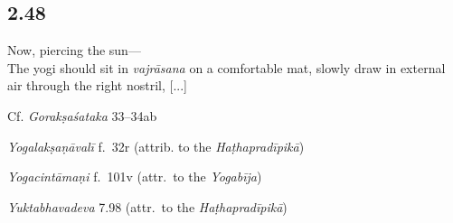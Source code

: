\begin{ekdosis}

\subsection*{2.48}
\begin{translation}[hp02_048]
Now, piercing the sun---\\
The yogi should sit in \emph{vajrāsana} on a comfortable mat, slowly draw in external air through the right nostril, [...]
\end{translation}

\begin{sources}[hp02_048]
Cf. \emph{Gorakṣaśataka} 33–34ab
\begin{versinnote}
\end{versinnote} 
\end{sources}

\begin{testimonia}[hp02_048]
\emph{Yogalakṣaṇāvalī} f.~32r (attrib. to the \emph{Haṭhapradīpikā})
\begin{versinnote}
\end{versinnote}

\emph{Yogacintāmaṇi} f.~101v (attr.~to the \emph{Yogabīja})

\begin{versinnote}
\end{versinnote} 

\emph{Yuktabhavadeva} 7.98 (attr.~to the \emph{Haṭhapradīpikā})

\begin{versinnote}
\end{versinnote}
\end{testimonia}


\end{ekdosis}
